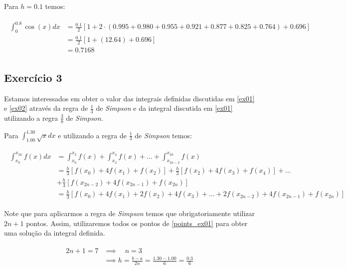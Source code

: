 \documentclass[paper=a4, fontsize=12pt]{scrartcl}
\numberwithin{equation}{section} %
\numberwithin{figure}{section} %
\numberwithin{table}{section} %
\begin{document}
		Para $h = 0.1$ temos:

		\begin{align*}
		\begin{split}
		\int_{0}^{0.8} \cos{(x)} dx 	&= \frac{0.1}{2}\left[ 1  + 2\cdot (0.995 + 0.980 + 0.955 + 0.921 + 0.877 + 0.825 + 0.764) + 0.696 \right] \\
																	&=  \frac{0.1}{2}\left[ 1  + (12.64) + 0.696 \right] \\
																	&=  0.7168
		\end{split}
		\end{align*}

		\subsection{Exercício 3}

		Estamos interessados em obter o valor das integrais definidas discutidas em \ref{ex01} e \ref{ex02} através da regra de $ \frac{1}{3} $ de \textit{Simpson} e da integral discutida em \ref{ex01} utilizando a regra $  \frac{3}{8} $ de \textit{Simpson}.

		Para $\int_{1.00}^{1.30} \sqrt{x} dx$ e utilizando a regra de $ \frac{1}{3} $ de \textit{Simpson} temos:

		\begin{align*}
			\begin{split}
			\int_{x_0}^{x_{2n}} f(x) dx 	&= \int_{x_0}^{x_2} f(x) + \int_{x_2}^{x_4} f(x) + \ldots + \int_{x_{2n-2}}^{x_{2n}} f(x) \\
			&= \frac{h}{3}\left[ f(x_0) + 4f(x_1) + f(x_2)\right] + \frac{h}{3}\left[ f(x_2) + 4f(x_3) + f(x_4) \right] + \ldots \\&+ \frac{h}{3}\left[ f(x_{2n-2}) + 4f(x_{2n-1}) + f(x_{2n}) \right] \\
			&= \frac{h}{3}\left[ f(x_0) + 4f(x_1) + 2f(x_2) + 4f(x_3) + \ldots + 2f(x_{2n-2}) + 4f(x_{2n-1}) + f(x_{2n}) \right]
			\end{split}
		\end{align*}

		Note que para aplicarmos a regra de \textit{Simpson} temos que obrigatoriamente utilizar $2n + 1$ pontos. Assim, utilizaremos todos os pontos de \ref{points_ex01} para obter uma solução da integral definida.

		\begin{align*}
			\begin{split}
				2n + 1 = 7 	&\implies \quad n = 3 \\
										&\implies h = \frac{b - a}{2n} = \frac{1.30 - 1.00}{6} = \frac{0.3}{6}\\
			\end{split}
		\end{align*}
\end{document}
